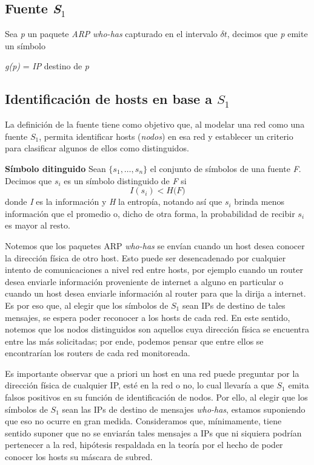 \subsection{Fuente \textit{S}$_1$}
Sea \textit{p} un paquete \textit{ARP} \textit{who-has} capturado en el intervalo $\delta t$, decimos que \textit{p} emite un símbolo
\begin{center}
	\textit{g(p)} = \textit{IP} destino de \textit{p}
\end{center}

\subsection{Identificación de hosts en base a $S_1$}
La definición de la fuente tiene como objetivo que, al modelar una red como una fuente $S_1$, permita identificar hosts (\textit{nodos}) en esa red y establecer un criterio para clasificar algunos de ellos como distinguidos.

\medskip

\textbf{Símbolo ditinguido} Sean $\{ s_1,\dots, s_n \}$ el conjunto de símbolos de una fuente \textit{F}. Decimos que $s_i$ es un símbolo distinguido de \textit{F} si
\begin{equation}
	\textit{I}(s_i) < \textit{H(F)}
\end{equation}
donde \textit{I} es la información y \textit{H} la entropía, notando así que $s_i$ brinda menos información que el promedio o, dicho de otra forma, la probabilidad de recibir $s_i$ es mayor al resto.

\medskip

Notemos que los paquetes ARP \textit{who-has} se envían cuando un host desea conocer la dirección física de otro host. Esto puede ser desencadenado por cualquier intento de comunicaciones a nivel red entre hosts, por ejemplo cuando un router desea enviarle información proveniente de internet a alguno en particular o cuando un host desea enviarle información al router para que la dirija a internet. Es por eso que, al elegir que los símbolos de $S_1$ sean IPs de destino de tales mensajes, se espera poder reconocer a los hosts de cada red. En este sentido, notemos que los nodos distinguidos son aquellos cuya dirección física se encuentra entre las más solicitadas; por ende, podemos pensar que entre ellos se encontrarían los routers de cada red monitoreada.

Es importante observar que a priori un host en una red puede preguntar por la dirección física de cualquier IP, esté en la red o no, lo cual llevaría a que $S_1$ emita falsos positivos en su función de identificación de nodos. Por ello, al elegir que los símbolos de $S_1$ sean las IPs de destino de mensajes \textit{who-has}, estamos suponiendo que eso no ocurre en gran medida. Consideramos que, mínimamente, tiene sentido suponer que no se enviarán tales mensajes a IPs que ni siquiera podrían pertenecer a la red, hipótesis respaldada en la teoría por el hecho de poder conocer los hosts su máscara de subred.

